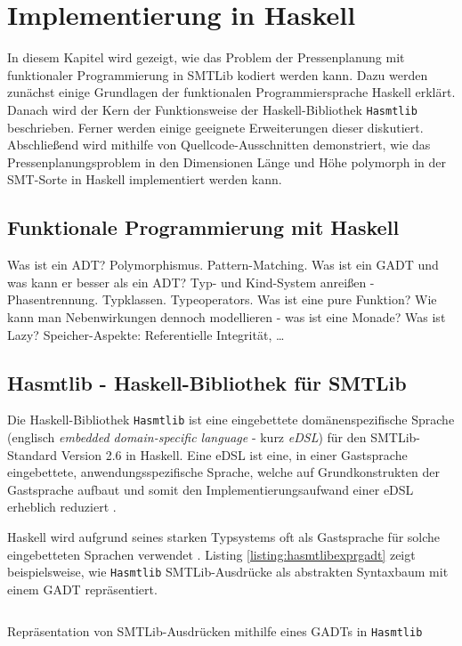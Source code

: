\chapter{Implementierung in Haskell}
\label{chapter:implementierung}
In diesem Kapitel wird gezeigt, wie das Problem der Pressenplanung mit funktionaler Programmierung in SMTLib kodiert werden kann.
Dazu werden zunächst einige Grundlagen der funktionalen Programmiersprache Haskell erklärt.
Danach wird der Kern der Funktionsweise der Haskell-Bibliothek \texttt{Hasmtlib} \cite{hasmtlib} beschrieben.
Ferner werden einige geeignete Erweiterungen dieser diskutiert.
Abschließend wird mithilfe von Quellcode-Ausschnitten demonstriert,
wie das Pressenplanungsproblem in den Dimensionen Länge und Höhe polymorph in der SMT-Sorte in Haskell implementiert werden kann.

\section{Funktionale Programmierung mit Haskell}
\label{sec:haskell}
Was ist ein ADT?
Polymorphismus.
Pattern-Matching.
Was ist ein GADT und was kann er besser als ein ADT?
Typ- und Kind-System anreißen - Phasentrennung.
Typklassen.
Typeoperators.
Was ist eine pure Funktion?
Wie kann man Nebenwirkungen dennoch modellieren - was ist eine Monade?
Was ist Lazy?
Speicher-Aspekte: Referentielle Integrität, \ldots

\section{Hasmtlib - Haskell-Bibliothek für SMTLib}
Die Haskell-Bibliothek \texttt{Hasmtlib} \cite{hasmtlib} ist eine eingebettete domänenspezifische Sprache
(englisch \textit{embedded domain-specific language} - kurz \textit{eDSL}) für den SMTLib-Standard Version 2.6 \cite{smtlib} in Haskell.
Eine eDSL ist eine, in einer Gastsprache eingebettete, anwendungsspezifische Sprache, welche auf Grundkonstrukten der Gastsprache aufbaut und somit den
Implementierungsaufwand einer eDSL erheblich reduziert \cite{eDSL}.

Haskell wird aufgrund seines starken Typsystems oft als Gastsprache für solche eingebetteten Sprachen verwendet \cite{eDSL2}.
Listing \ref{listing:hasmtlibexprgadt} zeigt beispielsweise, wie \texttt{Hasmtlib} SMTLib-Ausdrücke als abstrakten Syntaxbaum mit einem GADT repräsentiert.

\begin{listing}[H]
    \inputminted[linenos=true]{haskell}{Code/Implementierung/Hasmtlib/ExprGADT.hs}
    \caption{Repräsentation von SMTLib-Ausdrücken mithilfe eines GADTs in \texttt{Hasmtlib} \cite{hasmtlibExpr}}
    \label{listing:hasmtlibexprgadt}
\end{listing}


